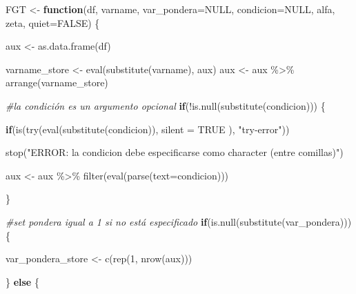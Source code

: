 \documentclass[
]{book}
\newenvironment{Shaded}{\begin{snugshade}}{\end{snugshade}}
\newcommand{\AttributeTok}[1]{\textcolor[rgb]{0.77,0.63,0.00}{#1}}
\newcommand{\CommentTok}[1]{\textcolor[rgb]{0.56,0.35,0.01}{\textit{#1}}}
\newcommand{\ConstantTok}[1]{\textcolor[rgb]{0.00,0.00,0.00}{#1}}
\newcommand{\ControlFlowTok}[1]{\textcolor[rgb]{0.13,0.29,0.53}{\textbf{#1}}}
\newcommand{\DecValTok}[1]{\textcolor[rgb]{0.00,0.00,0.81}{#1}}
\newcommand{\FunctionTok}[1]{\textcolor[rgb]{0.00,0.00,0.00}{#1}}
\newcommand{\NormalTok}[1]{#1}
\newcommand{\OtherTok}[1]{\textcolor[rgb]{0.56,0.35,0.01}{#1}}
\newcommand{\SpecialCharTok}[1]{\textcolor[rgb]{0.00,0.00,0.00}{#1}}
\newcommand{\StringTok}[1]{\textcolor[rgb]{0.31,0.60,0.02}{#1}}
\begin{document}
\begin{Shaded}
\begin{Highlighting}[numbers=left,,]
\NormalTok{FGT }\OtherTok{\textless{}{-}} \ControlFlowTok{function}\NormalTok{(df, varname, }\AttributeTok{var\_pondera=}\ConstantTok{NULL}\NormalTok{, }\AttributeTok{condicion=}\ConstantTok{NULL}\NormalTok{, alfa, zeta, }\AttributeTok{quiet=}\ConstantTok{FALSE}\NormalTok{) \{}
  
\NormalTok{  aux }\OtherTok{\textless{}{-}} \FunctionTok{as.data.frame}\NormalTok{(df) }
  
\NormalTok{  varname\_store }\OtherTok{\textless{}{-}} \FunctionTok{eval}\NormalTok{(}\FunctionTok{substitute}\NormalTok{(varname), aux) }
\NormalTok{  aux }\OtherTok{\textless{}{-}}\NormalTok{ aux }\SpecialCharTok{\%\textgreater{}\%} \FunctionTok{arrange}\NormalTok{(varname\_store)}
  
  
  \CommentTok{\#la condición es un argumento opcional}
  \ControlFlowTok{if}\NormalTok{(}\SpecialCharTok{!}\FunctionTok{is.null}\NormalTok{(}\FunctionTok{substitute}\NormalTok{(condicion))) \{}
      
     \ControlFlowTok{if}\NormalTok{(}\FunctionTok{is}\NormalTok{(}\FunctionTok{try}\NormalTok{(}\FunctionTok{eval}\NormalTok{(}\FunctionTok{substitute}\NormalTok{(condicion)), }\AttributeTok{silent =} \ConstantTok{TRUE}\NormalTok{ ), }\StringTok{"try{-}error"}\NormalTok{))}
        
        \FunctionTok{stop}\NormalTok{(}\StringTok{"ERROR: la condicion debe especificarse como character (entre comillas)"}\NormalTok{)}
      
\NormalTok{        aux }\OtherTok{\textless{}{-}}\NormalTok{ aux }\SpecialCharTok{\%\textgreater{}\%} \FunctionTok{filter}\NormalTok{(}\FunctionTok{eval}\NormalTok{(}\FunctionTok{parse}\NormalTok{(}\AttributeTok{text=}\NormalTok{condicion)))     }
                                                              
\NormalTok{   \}}
    
  
  \CommentTok{\#set pondera igual a 1 si no está especificado}
  \ControlFlowTok{if}\NormalTok{(}\FunctionTok{is.null}\NormalTok{(}\FunctionTok{substitute}\NormalTok{(var\_pondera))) \{                           }
    
\NormalTok{    var\_pondera\_store }\OtherTok{\textless{}{-}} \FunctionTok{c}\NormalTok{(}\FunctionTok{rep}\NormalTok{(}\DecValTok{1}\NormalTok{, }\FunctionTok{nrow}\NormalTok{(aux)))}
    
\NormalTok{  \} }\ControlFlowTok{else}\NormalTok{ \{}
    

\end{Highlighting}
\end{Shaded}
\end{document}
